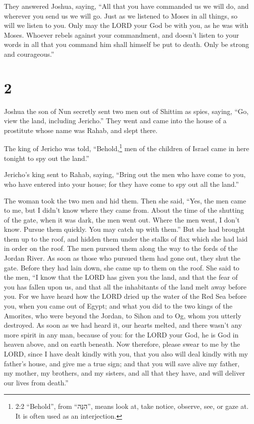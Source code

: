  They answered Joshua, saying, ``All that you have
commanded us we will do, and wherever you send us we will go.
 Just as we listened to Moses in all things, so will we
listen to you. Only may the LORD your God be with you, as he was with
Moses.  Whoever rebels against your commandment, and
doesn't listen to your words in all that you command him shall himself
be put to death. Only be strong and courageous.''

\hypertarget{section-1}{%
\section{2}\label{section-1}}

 Joshua the son of Nun secretly sent two men out of Shittim
as spies, saying, ``Go, view the land, including Jericho.'' They went
and came into the house of a prostitute whose name was Rahab, and slept
there.

 The king of Jericho was told, ``Behold,\footnote{2:2
  ``Behold'', from ``הִנֵּה'', means look at, take notice, observe, see,
  or gaze at. It is often used as an interjection.} men of the children
of Israel came in here tonight to spy out the land.''

 Jericho's king sent to Rahab, saying, ``Bring out the men
who have come to you, who have entered into your house; for they have
come to spy out all the land.''

 The woman took the two men and hid them. Then she said,
``Yes, the men came to me, but I didn't know where they came from.
 About the time of the shutting of the gate, when it was
dark, the men went out. Where the men went, I don't know. Pursue them
quickly. You may catch up with them.''  But she had brought
them up to the roof, and hidden them under the stalks of flax which she
had laid in order on the roof.  The men pursued them along
the way to the fords of the Jordan River. As soon as those who pursued
them had gone out, they shut the gate.  Before they had lain
down, she came up to them on the roof.  She said to the men,
``I know that the LORD has given you the land, and that the fear of you
has fallen upon us, and that all the inhabitants of the land melt away
before you.  For we have heard how the LORD dried up the
water of the Red Sea before you, when you came out of Egypt; and what
you did to the two kings of the Amorites, who were beyond the Jordan, to
Sihon and to Og, whom you utterly destroyed.  As soon as we
had heard it, our hearts melted, and there wasn't any more spirit in any
man, because of you: for the LORD your God, he is God in heaven above,
and on earth beneath.  Now therefore, please swear to me by
the LORD, since I have dealt kindly with you, that you also will deal
kindly with my father's house, and give me a true sign; 
and that you will save alive my father, my mother, my brothers, and my
sisters, and all that they have, and will deliver our lives from
death.''

